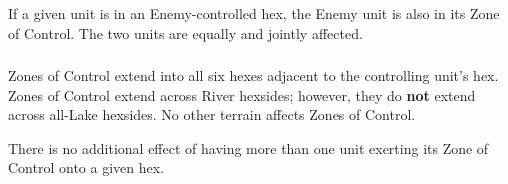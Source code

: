 \subsubsection{} If a given unit is in an Enemy-controlled hex, the Enemy unit is also in its Zone of Control. The two units are equally and jointly affected.

\subsubsection{} Zones of Control extend into all six hexes adjacent to the controlling unit's hex. Zones of Control extend across River hexsides; however, they do \textbf{not} extend across all-Lake hexsides. No other terrain affects Zones of Control.

There is no additional effect of having more than one unit exerting its Zone of Control onto a given hex.